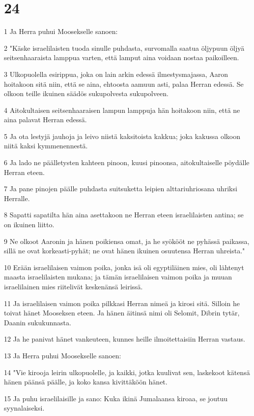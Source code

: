 \chapter{24}

\par 1 Ja Herra puhui Moosekselle sanoen:
\par 2 "Käske israelilaisten tuoda sinulle puhdasta, survomalla saatua öljypuun öljyä seitsenhaaraista lamppua varten, että lamput aina voidaan nostaa paikoilleen.
\par 3 Ulkopuolella esirippua, joka on lain arkin edessä ilmestysmajassa, Aaron hoitakoon sitä niin, että se aina, ehtoosta aamuun asti, palaa Herran edessä. Se olkoon teille ikuinen säädös sukupolvesta sukupolveen.
\par 4 Aitokultaisen seitsenhaaraisen lampun lamppuja hän hoitakoon niin, että ne aina palavat Herran edessä.
\par 5 Ja ota lestyjä jauhoja ja leivo niistä kaksitoista kakkua; joka kakussa olkoon niitä kaksi kymmenennestä.
\par 6 Ja lado ne päälletysten kahteen pinoon, kuusi pinoonsa, aitokultaiselle pöydälle Herran eteen.
\par 7 Ja pane pinojen päälle puhdasta suitsuketta leipien alttariuhriosana uhriksi Herralle.
\par 8 Sapatti sapatilta hän aina asettakoon ne Herran eteen israelilaisten antina; se on ikuinen liitto.
\par 9 Ne olkoot Aaronin ja hänen poikiensa omat, ja he syökööt ne pyhässä paikassa, sillä ne ovat korkeasti-pyhät; ne ovat hänen ikuinen osuutensa Herran uhreista."
\par 10 Erään israelilaisen vaimon poika, jonka isä oli egyptiläinen mies, oli lähtenyt maasta israelilaisten mukana; ja tämän israelilaisen vaimon poika ja muuan israelilainen mies riitelivät keskenänsä leirissä.
\par 11 Ja israelilaisen vaimon poika pilkkasi Herran nimeä ja kirosi sitä. Silloin he toivat hänet Mooseksen eteen. Ja hänen äitinsä nimi oli Selomit, Dibrin tytär, Daanin sukukunnasta.
\par 12 Ja he panivat hänet vankeuteen, kunnes heille ilmoitettaisiin Herran vastaus.
\par 13 Ja Herra puhui Moosekselle sanoen:
\par 14 "Vie kirooja leirin ulkopuolelle, ja kaikki, jotka kuulivat sen, laskekoot kätensä hänen päänsä päälle, ja koko kansa kivittäköön hänet.
\par 15 Ja puhu israelilaisille ja sano: Kuka ikinä Jumalaansa kiroaa, se joutuu syynalaiseksi.
